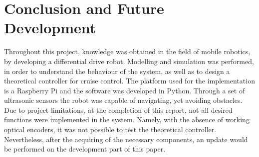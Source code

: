 \chapter{Conclusion and Future Development}\label{ch:conclusion}

Throughout this project, knowledge was obtained in the field of mobile robotics, by developing a differential drive robot. Modelling and simulation was performed, in order to understand the behaviour of the system, as well as to design a theoretical controller for cruise control.
The platform used for the implementation is a Raspberry Pi and the software was developed in Python. Through a set of ultrasonic sensors the robot was capable of navigating, yet avoiding obstacles. Due to project limitations, at the completion of this report, not all desired functions were implemented in the system. Namely, with the absence of working optical encoders, it was not possible to test the theoretical controller. Nevertheless, after the acquiring of the necessary components, an update would be performed on the development part of this paper. 